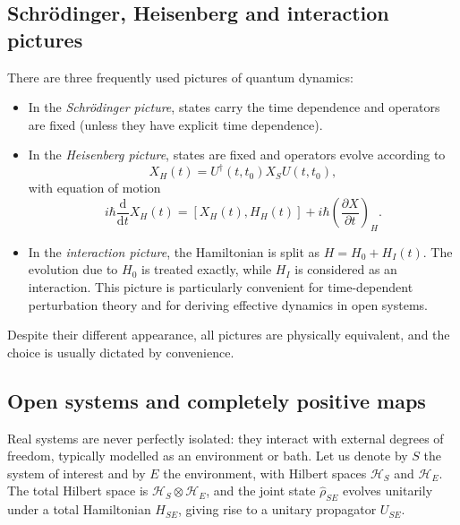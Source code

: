 \subsection{Schrödinger, Heisenberg and interaction pictures}

There are three frequently used pictures of quantum dynamics:

\begin{itemize}
	\item In the \emph{Schrödinger picture}, states carry the time dependence and operators are fixed (unless they have explicit time dependence).
	\item In the \emph{Heisenberg picture}, states are fixed and operators evolve according to
	\begin{equation}
		X_H(t) = U^\dagger(t,t_0) X_S U(t,t_0),
	\end{equation}
	with equation of motion
	\begin{equation}
		i \hbar \frac{\mathrm{d}}{\mathrm{d}t} X_H(t) = [X_H(t), H_H(t)] + i \hbar \left(\frac{\partial X}{\partial t}\right)_H.
	\end{equation}
	\item In the \emph{interaction picture}, the Hamiltonian is split as $H = H_0 + H_I(t)$. 
	The evolution due to $H_0$ is treated exactly, while $H_I$ is considered as an interaction. 
	This picture is particularly convenient for time-dependent perturbation theory and for deriving effective dynamics in open systems.
\end{itemize}
Despite their different appearance, all pictures are physically equivalent, and the choice is usually dictated by convenience.

\subsection{Open systems and completely positive maps}

Real systems are never perfectly isolated: they interact with external degrees of freedom, typically modelled as an environment or bath. 
Let us denote by $S$ the system of interest and by $E$ the environment, with Hilbert spaces $\mathcal{H}_S$ and $\mathcal{H}_E$. 
The total Hilbert space is $\mathcal{H}_S \otimes \mathcal{H}_E$, and the joint state $\hat{\rho}_{SE}$ evolves unitarily under a total Hamiltonian $H_{SE}$, giving rise to a unitary propagator $U_{SE}$.

